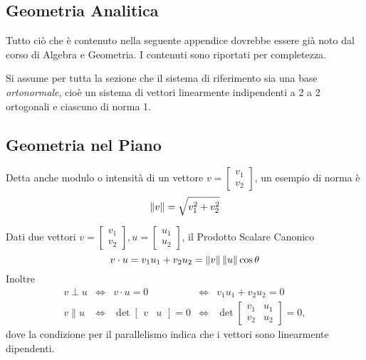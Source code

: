 \renewcommand{\thesection}{\Alph{section}} %
\begin{appendices}
\section{Geometria Analitica}
Tutto ciò che è contenuto nella seguente appendice dovrebbe essere già noto dal corso di Algebra e Geometria. I contenuti sono riportati per completezza.

\par
Si assume per tutta la sezione che il sistema di riferimento sia una base \emph{ortonormale},
cioè un sistema di vettori linearmente indipendenti a 2 a 2 ortogonali e ciascuno di norma 1.

\subsection{Geometria nel Piano}\label{sect:geom_piano}
\begin{definition}[Norma]
	Detta anche modulo o intensità di un vettore $ v = \begin{bmatrix} v_1 \\ v_2 \end{bmatrix} $, un esempio di norma è
	\[ \left\|v\right\| = \sqrt{v_1^2 + v_2^2} \]
\end{definition}
\begin{definition}
	Dati due vettori $ v = \begin{bmatrix} v_1 \\ v_2 \end{bmatrix},  u = \begin{bmatrix} u_1 \\ u_2 \end{bmatrix} $, il Prodotto Scalare Canonico
	\[ v \cdot u = v_1 u_1 + v_2 u_2 = \left\|v\right\| \left\|u\right\| \cos \theta \]
	Inoltre
	\[
		\begin{array}{lcccc}
			v \perp u & \iff & v \cdot u = 0 & \iff & v_1 u_1 + v_2 u_2 = 0\\
			v \parallel u & \iff & \det\begin{bmatrix} v&u \end{bmatrix} = 0 & \iff & \det \begin{bmatrix} v_1&u_1 \\ v_2&u_2 \end{bmatrix} = 0,
		\end{array}
	\]
	dove la condizione per il parallelismo indica che i vettori sono linearmente dipendenti.
\end{definition}


\end{appendices}
